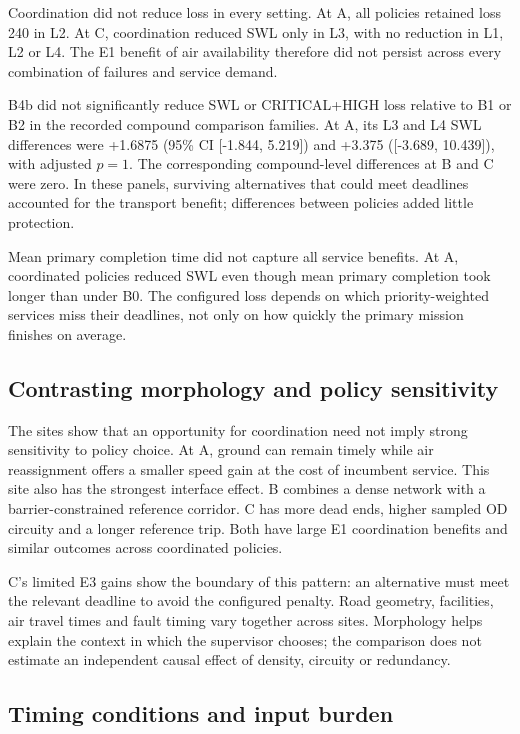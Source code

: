 \documentclass[]{interact}
\theoremstyle{plain}
\theoremstyle{definition}
\theoremstyle{remark}
\begin{document}
Coordination did not reduce loss in every setting. At A, all policies retained loss 240 in L2. At C, coordination reduced SWL only in L3, with no reduction in L1, L2 or L4. The E1 benefit of air availability therefore did not persist across every combination of failures and service demand.

B4b did not significantly reduce SWL or CRITICAL+HIGH loss relative to B1 or B2 in the recorded compound comparison families. At A, its L3 and L4 SWL differences were +1.6875 (95\% CI [-1.844, 5.219]) and +3.375 ([-3.689, 10.439]), with adjusted $p=1$. The corresponding compound-level differences at B and C were zero. In these panels, surviving alternatives that could meet deadlines accounted for the transport benefit; differences between policies added little protection.

Mean primary completion time did not capture all service benefits. At A, coordinated policies reduced SWL even though mean primary completion took longer than under B0. The configured loss depends on which priority-weighted services miss their deadlines, not only on how quickly the primary mission finishes on average.

\subsection{Contrasting morphology and policy sensitivity}

The sites show that an opportunity for coordination need not imply strong sensitivity to policy choice. At A, ground can remain timely while air reassignment offers a smaller speed gain at the cost of incumbent service. This site also has the strongest interface effect. B combines a dense network with a barrier-constrained reference corridor. C has more dead ends, higher sampled OD circuity and a longer reference trip. Both have large E1 coordination benefits and similar outcomes across coordinated policies.

C's limited E3 gains show the boundary of this pattern: an alternative must meet the relevant deadline to avoid the configured penalty. Road geometry, facilities, air travel times and fault timing vary together across sites. Morphology helps explain the context in which the supervisor chooses; the comparison does not estimate an independent causal effect of density, circuity or redundancy.

\subsection{Timing conditions and input burden}
\end{document}
